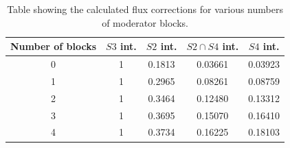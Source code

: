 	\begin{table}
		\centering
		\begin{tabular}{|c|c|c|c|c|}
			\hline
			Number of blocks & $S3$ int. & $S2$ int. & $S2 \cap S4$ int. & $S4$ int. \\
			\hline
			0 & 1 & 0.1813 & 0.03661 & 0.03923 \\
			1 & 1 & 0.2965 & 0.08261 & 0.08759 \\
			2 & 1 & 0.3464 & 0.12480 & 0.13312 \\
			3 & 1 & 0.3695 & 0.15070 & 0.16410 \\
			4 & 1 & 0.3734 & 0.16225 & 0.18103 \\
			\hline		
		\end{tabular}
		\caption{Table showing the calculated flux corrections for various numbers of moderator blocks.}
		\label{tab:fluxFactors}
	\end{table}
	